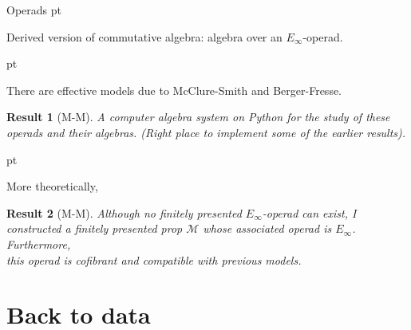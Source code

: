 \documentclass[10pt,t, handout]{beamer} %
\newtheorem{result}{Result}
\begin{document}
\begin{frame}{Operads}
	 pt
	\pause
	
	\textcolor{pblue}{Derived version} of commutative algebra: algebra over an $E_\infty$-operad.
	
	 pt
	\pause
	
	There are effective models due to McClure-Smith and Berger-Fresse.
	
	\pause
	
	\begin{result}[M-M]
		A computer algebra system on Python for the study of these operads and their algebras. (Right place to implement some of the earlier results).
	\end{result}
	
	 pt
	\pause
	
	More theoretically,
	
	\begin{result}[M-M]
		Although no finitely presented $E_\infty$-operad can exist, I constructed a finitely presented prop $\mathcal M$ whose associated operad is $E_\infty$. Furthermore, \\
		this operad is cofibrant and compatible with previous models.		
	\end{result}
\end{frame}

\section{Back to data}
\end{document}

